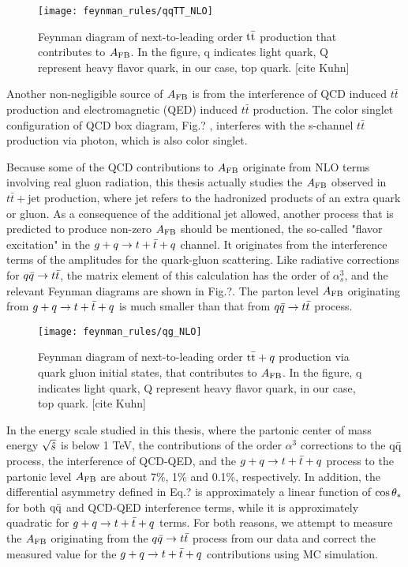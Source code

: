 \begin{figure}[hbt]
	\begin{center}
		\texttt{[image: feynman\_rules/qqTT\_NLO]}
		\caption{\small Feynman diagram of next-to-leading order $\mathrm{t}\bar{\mathrm{t}}$ production that contributes to $A_{\mathrm{FB}}$. In the figure, q indicates light quark, Q represent heavy flavor quark, in our case, top quark. [cite Kuhn]}
		\label{fig:qqTT_NLO}
	\end{center}
\end{figure}

Another non-negligible source of $A_{\mathrm{FB}}$ is from the interference of QCD induced $t\bar t$ production and electromagnetic (QED) induced $t\bar t$ production. The color singlet configuration of QCD box diagram, Fig.? , interferes with the s-channel $t\bar t$ production via photon, which is also color singlet.

Because some of the QCD contributions to $A_{\mathrm{FB}}$ originate from NLO terms involving real gluon radiation, this thesis actually studies the $A_{\mathrm{FB}}$ observed in $t\bar t +\mathrm{jet}$ production, where jet refers to the hadronized products of an extra quark or gluon. As a consequence of the additional jet allowed, another process that is predicted to produce non-zero $A_{\mathrm{FB}}$ should be mentioned, the so-called "flavor excitation" in the $g+q \rightarrow t+ \bar t+q$ channel. It originates from the interference terms of the amplitudes for the quark-gluon scattering. Like radiative corrections for $q\bar q \rightarrow t \bar t$, the matrix element of this calculation has the order of $\alpha_s^3$, and the relevant Feynman diagrams are shown in Fig.?. The parton level $A_{\mathrm{FB}}$ originating from $g+q \rightarrow t+ \bar t+q$ is much smaller than that from $q\bar q \rightarrow t \bar t$ process.

\begin{figure}[hbt]
	\begin{center}
		\texttt{[image: feynman\_rules/qg\_NLO]}
		\caption{\small Feynman diagram of next-to-leading order $\mathrm{t}\bar{\mathrm{t}}+q$ production via quark gluon initial states, that contributes to $A_{\mathrm{FB}}$. In the figure, q indicates light quark, Q represent heavy flavor quark, in our case, top quark. [cite Kuhn]}
		\label{fig:gg_tt_LO}
	\end{center}
\end{figure}

In the energy scale studied in this thesis, where the partonic center of mass energy $\sqrt{\hat s}$ is below 1 TeV, the contributions of the order $\alpha^3$ corrections to the $\mathrm{q \bar{q}}$ process, the interference of QCD-QED, and the $g+q \rightarrow t+ \bar t+q$ process to the partonic level $A_{\mathrm{FB}}$ are about 7\%, 1\% and 0.1\%, respectively.  In addition, the differential asymmetry defined in Eq.? is approximately a linear function of $\cos\theta_*$ for both $\mathrm{q \bar{q}}$ and QCD-QED interference terms, while it is approximately quadratic for $g+q \rightarrow t+ \bar t+q$ terms. For both reasons, we attempt to measure the $A_{\mathrm{FB}}$ originating from the $q\bar q \rightarrow t \bar t$ process from our data and correct the measured value for the $g+q \rightarrow t+ \bar t+q$ contributions using MC simulation.

